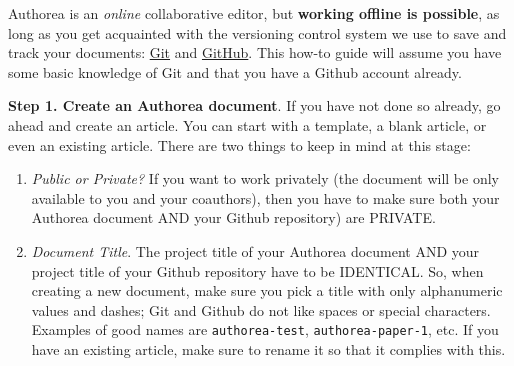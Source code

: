 Authorea is an \textit{online} collaborative editor, but \textbf{working offline is possible}, as long as you get acquainted with the versioning control system we use to save and track your documents: \href{http://git-scm.com/}{Git} and \href{http://github.com/}{GitHub}. This how-to guide will assume you have some basic knowledge of Git and that you have a Github account already. 

\textbf{Step 1. Create an Authorea document}. If you have not done so already, go ahead and create an article. You can start with a template, a blank article, or even an existing article. There are two things to keep in mind at this stage:

\begin{enumerate}
\item \textit{Public or Private?} If you want to work privately (the document will be only available to you and your coauthors), then you have to make sure both your Authorea document AND your Github repository) are PRIVATE.
\item \textit{Document Title}. The project title of your Authorea document AND your project title of your Github repository have to be IDENTICAL. So, when creating a new document, make sure you pick a title with only alphanumeric values and dashes; Git and Github do not like spaces or special characters. Examples of good names are \verb|authorea-test|, \verb|authorea-paper-1|, etc. If you have an existing article, make sure to rename it so that it complies with this.
\end{enumerate}
